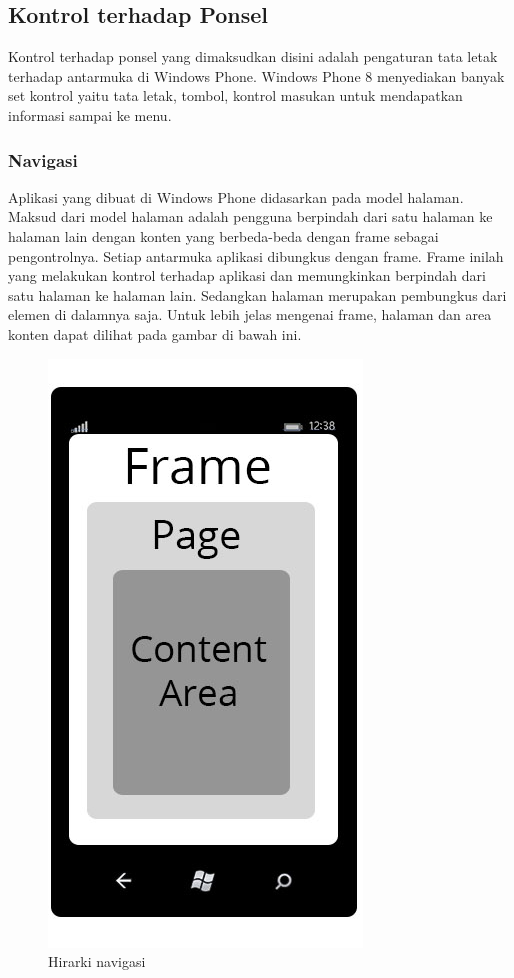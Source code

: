 \subsection{Kontrol terhadap Ponsel}
\label{subsec:Kontrol terhadap Ponsel}
\hspace{0.5cm} Kontrol terhadap ponsel yang dimaksudkan disini adalah pengaturan tata letak terhadap antarmuka di Windows Phone. Windows Phone 8 menyediakan banyak set kontrol yaitu tata letak, tombol, kontrol masukan untuk mendapatkan informasi sampai ke menu. 

\subsubsection{Navigasi}
\label{subsubsec:Navigasi}
\hspace{0.5cm} Aplikasi yang dibuat di Windows Phone didasarkan pada model halaman. Maksud dari model halaman adalah pengguna berpindah dari satu halaman ke halaman lain dengan konten yang berbeda-beda dengan frame sebagai pengontrolnya. Setiap antarmuka aplikasi dibungkus dengan frame. Frame inilah yang melakukan kontrol terhadap aplikasi dan memungkinkan berpindah dari satu halaman ke halaman lain. Sedangkan halaman merupakan pembungkus dari elemen di dalamnya saja. Untuk lebih jelas mengenai frame, halaman dan area konten dapat dilihat pada gambar di bawah ini.

\begin{figure}[h]
	\centering
		\includegraphics[scale=0.5]{Gambar/nav_hierarchy}
	\caption{Hirarki navigasi}
	\label{fig:nav_hierarchy}
\end{figure}


